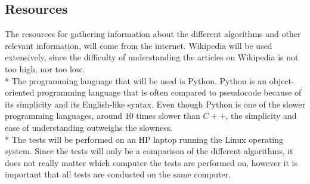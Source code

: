 \documentclass[main.tex]{subfiles}
\begin{document}
\subsection{Resources}
The resources for gathering information about the different algorithms and other relevant information, will come from the internet. Wikipedia will be used extensively, since the difficulty of understanding the articles on Wikipedia is not too high, nor too low.
\newline
\\*
The programming language that will be used is Python. Python is an object-oriented programming language that is often compared to pseudocode because of its simplicity and its English-like syntax. Even though Python is one of the slower programming languages, around $10$ times slower than $C++$, the simplicity and ease of understanding outweighs the slowness. 
\newline
\\*
The tests will be performed on an HP laptop running the Linux operating system.
Since the tests will only be a comparison of the different algorithms, it does not really matter which computer the tests are performed on, however it is important that all tests are conducted on the same computer. 
\end{document}
